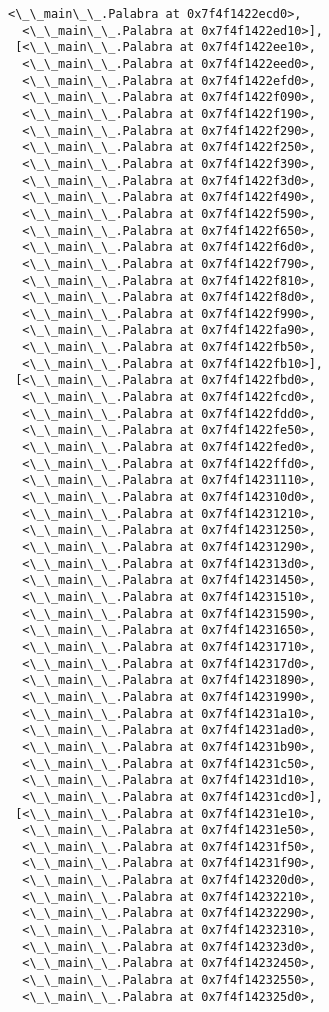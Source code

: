 \documentclass[12pt,a4paper,table]{article}
\begin{document}
\begin{tcolorbox}[breakable, size=fbox, boxrule=.5pt, pad at break*=1mm, opacityfill=0]
\begin{Verbatim}[commandchars=\\\{\}]
  <\_\_main\_\_.Palabra at 0x7f4f1422ecd0>,
  <\_\_main\_\_.Palabra at 0x7f4f1422ed10>],
 [<\_\_main\_\_.Palabra at 0x7f4f1422ee10>,
  <\_\_main\_\_.Palabra at 0x7f4f1422eed0>,
  <\_\_main\_\_.Palabra at 0x7f4f1422efd0>,
  <\_\_main\_\_.Palabra at 0x7f4f1422f090>,
  <\_\_main\_\_.Palabra at 0x7f4f1422f190>,
  <\_\_main\_\_.Palabra at 0x7f4f1422f290>,
  <\_\_main\_\_.Palabra at 0x7f4f1422f250>,
  <\_\_main\_\_.Palabra at 0x7f4f1422f390>,
  <\_\_main\_\_.Palabra at 0x7f4f1422f3d0>,
  <\_\_main\_\_.Palabra at 0x7f4f1422f490>,
  <\_\_main\_\_.Palabra at 0x7f4f1422f590>,
  <\_\_main\_\_.Palabra at 0x7f4f1422f650>,
  <\_\_main\_\_.Palabra at 0x7f4f1422f6d0>,
  <\_\_main\_\_.Palabra at 0x7f4f1422f790>,
  <\_\_main\_\_.Palabra at 0x7f4f1422f810>,
  <\_\_main\_\_.Palabra at 0x7f4f1422f8d0>,
  <\_\_main\_\_.Palabra at 0x7f4f1422f990>,
  <\_\_main\_\_.Palabra at 0x7f4f1422fa90>,
  <\_\_main\_\_.Palabra at 0x7f4f1422fb50>,
  <\_\_main\_\_.Palabra at 0x7f4f1422fb10>],
 [<\_\_main\_\_.Palabra at 0x7f4f1422fbd0>,
  <\_\_main\_\_.Palabra at 0x7f4f1422fcd0>,
  <\_\_main\_\_.Palabra at 0x7f4f1422fdd0>,
  <\_\_main\_\_.Palabra at 0x7f4f1422fe50>,
  <\_\_main\_\_.Palabra at 0x7f4f1422fed0>,
  <\_\_main\_\_.Palabra at 0x7f4f1422ffd0>,
  <\_\_main\_\_.Palabra at 0x7f4f14231110>,
  <\_\_main\_\_.Palabra at 0x7f4f142310d0>,
  <\_\_main\_\_.Palabra at 0x7f4f14231210>,
  <\_\_main\_\_.Palabra at 0x7f4f14231250>,
  <\_\_main\_\_.Palabra at 0x7f4f14231290>,
  <\_\_main\_\_.Palabra at 0x7f4f142313d0>,
  <\_\_main\_\_.Palabra at 0x7f4f14231450>,
  <\_\_main\_\_.Palabra at 0x7f4f14231510>,
  <\_\_main\_\_.Palabra at 0x7f4f14231590>,
  <\_\_main\_\_.Palabra at 0x7f4f14231650>,
  <\_\_main\_\_.Palabra at 0x7f4f14231710>,
  <\_\_main\_\_.Palabra at 0x7f4f142317d0>,
  <\_\_main\_\_.Palabra at 0x7f4f14231890>,
  <\_\_main\_\_.Palabra at 0x7f4f14231990>,
  <\_\_main\_\_.Palabra at 0x7f4f14231a10>,
  <\_\_main\_\_.Palabra at 0x7f4f14231ad0>,
  <\_\_main\_\_.Palabra at 0x7f4f14231b90>,
  <\_\_main\_\_.Palabra at 0x7f4f14231c50>,
  <\_\_main\_\_.Palabra at 0x7f4f14231d10>,
  <\_\_main\_\_.Palabra at 0x7f4f14231cd0>],
 [<\_\_main\_\_.Palabra at 0x7f4f14231e10>,
  <\_\_main\_\_.Palabra at 0x7f4f14231e50>,
  <\_\_main\_\_.Palabra at 0x7f4f14231f50>,
  <\_\_main\_\_.Palabra at 0x7f4f14231f90>,
  <\_\_main\_\_.Palabra at 0x7f4f142320d0>,
  <\_\_main\_\_.Palabra at 0x7f4f14232210>,
  <\_\_main\_\_.Palabra at 0x7f4f14232290>,
  <\_\_main\_\_.Palabra at 0x7f4f14232310>,
  <\_\_main\_\_.Palabra at 0x7f4f142323d0>,
  <\_\_main\_\_.Palabra at 0x7f4f14232450>,
  <\_\_main\_\_.Palabra at 0x7f4f14232550>,
  <\_\_main\_\_.Palabra at 0x7f4f142325d0>,

\end{Verbatim}
\end{tcolorbox}
\end{document}

